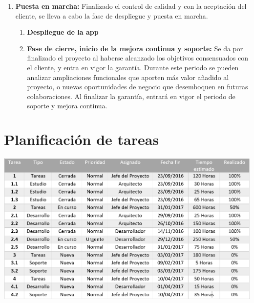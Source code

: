 \documentclass[a4paper,10pt]{scrartcl}
\begin{document}
\begin{enumerate}
	\item \textbf{Puesta en marcha:} Finalizado el control de calidad y con la aceptación del cliente, se lleva a cabo la fase de despliegue y puesta en marcha.
	\begin{enumerate}[label*=\arabic*.]
		\item \textbf{Despliegue de la app}
		\item \textbf{Fase de cierre, inicio de la mejora continua y soporte:} Se da por finalizado el proyecto al haberse alcanzado los objetivos consensuados con el cliente, y entra en vigor la garantía. Durante este periodo se pueden analizar ampliaciones funcionales que aporten más valor añadido al proyecto, o nuevas oportunidades de negocio que desemboquen en futuras colaboraciones. Al finalizar la garantía, entrará en vigor el periodo de soporte y mejora continua.
	\end{enumerate}
\end{enumerate}

\newpage

\section{Planificación de tareas}

\begin{center}
	\includegraphics[width=\linewidth]{tabla}
\end{center}




\end{document}
